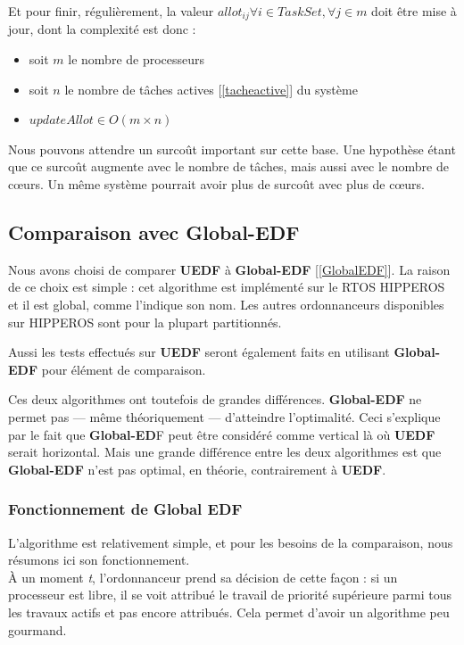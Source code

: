 	Et pour finir, régulièrement, la valeur $allot_{ij} \forall i \in TaskSet, \forall j \in m$ doit être mise 
	à jour, dont la complexité est donc :
	\begin{itemize}
		\setlength\itemsep{0.1em}
			\item soit $m$ le nombre de processeurs
			\item soit $n$ le nombre de tâches actives [\ref*{tacheactive}] du système
			\item $update Allot \in O(m\times n)$
	\end{itemize}

	Nous pouvons attendre un surcoût important sur cette base. Une hypothèse étant que ce surcoût 
	augmente avec le nombre de tâches, mais aussi avec le nombre de cœurs. Un même système pourrait avoir plus 
	de surcoût avec plus de cœurs. 

	
	\subsection{Comparaison avec Global-EDF}
	
	Nous avons choisi de comparer \textbf{UEDF} à \textbf{Global-EDF} [\ref*{GlobalEDF}]. 
	La raison de ce choix est simple : 
	cet algorithme est implémenté sur le RTOS HIPPEROS et il est global, comme 
	l'indique son nom. 
	Les autres ordonnanceurs disponibles sur HIPPEROS sont pour la plupart partitionnés.
 
	Aussi les tests effectués sur \textbf{UEDF} seront également faits en utilisant \textbf{Global-EDF} pour 
	élément de comparaison.\newline
	
	Ces deux algorithmes ont toutefois de grandes différences. \textbf{Global-EDF}
	ne permet pas --- même théoriquement --- d'atteindre l'optimalité. Ceci s'explique par le fait que 
	\textbf{Global-ED}F peut être considéré comme \og{}vertical\fg{} là où \textbf{UEDF} serait \og{}horizontal\fg{}. 
	Mais une grande différence entre les deux algorithmes est que \textbf{Global-EDF} n'est pas optimal, 
	en théorie, contrairement à \textbf{UEDF}.
	
	\subsubsection{Fonctionnement de Global EDF}
	
	L'algorithme est relativement simple, et pour les besoins de la comparaison, nous résumons 
	ici son fonctionnement.\\
	À un moment \textit{t}, l'ordonnanceur prend sa décision de cette façon :
	si un processeur est libre, il se voit attribué le travail de priorité supérieure parmi 
	tous les travaux actifs et pas encore attribués. Cela permet d'avoir un algorithme peu gourmand.
	

